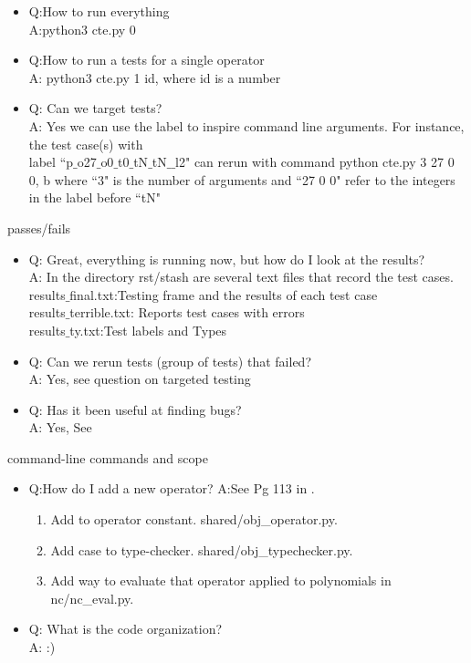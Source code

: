 \begin{description}[noitemsep]
\begin{itemize}[noitemsep]
\item Q:How to run everything \\ 
A:python3 cte.py 0
\item Q:How to run a tests for a single operator \\
A: python3  cte.py 1 id, where id is a number
\item Q: Can we target tests?\\
A: Yes we can use the label to inspire command line arguments.
For instance, the test case(s) with\\  label ``p$\_$o27$\_$o0$\_$t0$\_$tN$\_$tN$\_$$\_$l2"
 can rerun with command python cte.py 3  27 0 0, b   where ``3" is the number of arguments and ``27 0 0" refer to the integers in the label before ``tN"
 \end{itemize}
\item [Results] passes/fails
\begin{itemize}[noitemsep]
\item Q: Great, everything is running now, but how do I look at the results?\\
A: In the directory rst/stash are several text files that record the test cases.\\ \tab
results$\_$final.txt:Testing frame and the results of each test case \\ \tab
results$\_$terrible.txt: Reports test cases with errors\\ \tab
results$\_$ty.txt:Test labels and Types 
\item Q: Can we rerun tests (group of tests) that failed?\\
A: Yes, see question on targeted testing
\item Q: Has it been useful at finding bugs?\\
A: Yes, See \paperAst{}
\end{itemize}
\item [Development] command-line commands and scope
\begin{itemize}[noitemsep]
\item Q:How do I add a new operator? A:See Pg 113 in \diss{}.
\begin{enumerate}
\item Add to operator constant. shared/obj\_operator.py. 
\item Add case to type-checker. shared/obj\_typechecker.py. 
\item Add way to evaluate that operator applied to polynomials in nc/nc\_eval.py.
\end{enumerate}
\item Q: What is the code organization?\\
A: :) 
\end{itemize}
\end{description}